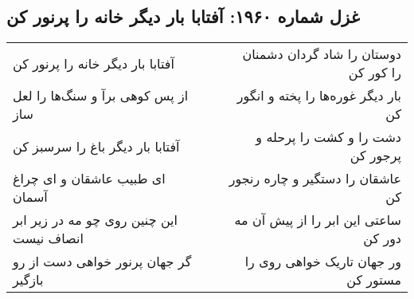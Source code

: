 \begin{center}
\section*{غزل شماره ۱۹۶۰: آفتابا بار دیگر خانه را پرنور کن}
\label{sec:1960}
\begin{longtable}{l p{0.5cm} r}
آفتابا بار دیگر خانه را پرنور کن
&&
دوستان را شاد گردان دشمنان را کور کن
\\
از پس کوهی برآ و سنگ‌ها را لعل ساز
&&
بار دیگر غوره‌ها را پخته و انگور کن
\\
آفتابا بار دیگر باغ را سرسبز کن
&&
دشت را و کشت را پرحله و پرجور کن
\\
ای طبیب عاشقان و ای چراغ آسمان
&&
عاشقان را دستگیر و چاره رنجور کن
\\
این چنین روی چو مه در زیر ابر انصاف نیست
&&
ساعتی این ابر را از پیش آن مه دور کن
\\
گر جهان پرنور خواهی دست از رو بازگیر
&&
ور جهان تاریک خواهی روی را مستور کن
\\
\end{longtable}
\end{center}
